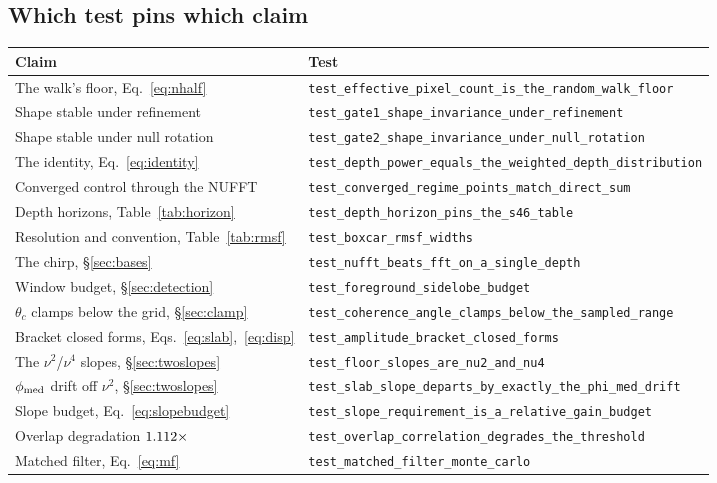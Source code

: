 \documentclass[11pt]{article}
\newcommand{\code}[1]{\texttt{#1}}
\begin{document}
\subsection{Which test pins which claim}

\begin{center}
\footnotesize
\begin{tabular}{ll}
\toprule
Claim & Test \\
\midrule
The walk's floor, Eq.~\eqref{eq:nhalf}
  & \code{test\_effective\_pixel\_count\_is\_the\_random\_walk\_floor} \\
Shape stable under refinement
  & \code{test\_gate1\_shape\_invariance\_under\_refinement} \\
Shape stable under null rotation
  & \code{test\_gate2\_shape\_invariance\_under\_null\_rotation} \\
The identity, Eq.~\eqref{eq:identity}
  & \code{test\_depth\_power\_equals\_the\_weighted\_depth\_distribution} \\
Converged control through the NUFFT
  & \code{test\_converged\_regime\_points\_match\_direct\_sum} \\
Depth horizons, Table~\ref{tab:horizon}
  & \code{test\_depth\_horizon\_pins\_the\_s46\_table} \\
Resolution and convention, Table~\ref{tab:rmsf}
  & \code{test\_boxcar\_rmsf\_widths} \\
The chirp, \S\ref{sec:bases}
  & \code{test\_nufft\_beats\_fft\_on\_a\_single\_depth} \\
Window budget, \S\ref{sec:detection}
  & \code{test\_foreground\_sidelobe\_budget} \\
$\theta_c$ clamps below the grid, \S\ref{sec:clamp}
  & \code{test\_coherence\_angle\_clamps\_below\_the\_sampled\_range} \\
Bracket closed forms, Eqs.~\eqref{eq:slab},~\eqref{eq:disp}
  & \code{test\_amplitude\_bracket\_closed\_forms} \\
The $\nu^2$/$\nu^4$ slopes, \S\ref{sec:twoslopes}
  & \code{test\_floor\_slopes\_are\_nu2\_and\_nu4} \\
$\phi_{\rm med}$ drift off $\nu^2$, \S\ref{sec:twoslopes}
  & \code{test\_slab\_slope\_departs\_by\_exactly\_the\_phi\_med\_drift} \\
Slope budget, Eq.~\eqref{eq:slopebudget}
  & \code{test\_slope\_requirement\_is\_a\_relative\_gain\_budget} \\
Overlap degradation $1.112\times$
  & \code{test\_overlap\_correlation\_degrades\_the\_threshold} \\
Matched filter, Eq.~\eqref{eq:mf}
  & \code{test\_matched\_filter\_monte\_carlo} \\
\bottomrule
\end{tabular}
\end{center}
\end{document}
